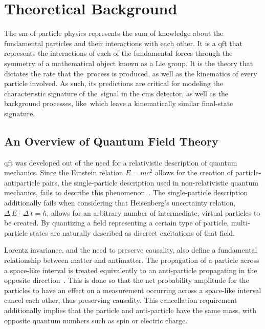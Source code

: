 \chapter{Theoretical Background}
\label{theoretical_background}

\par The \acrfull{sm} of particle physics represents the sum of
knowledge about the fundamental particles and their interactions with
each other.  It is a \acrfull{qft} that represents the interactions of each of the
fundamental forces through the symmetry of a mathematical object
known as a Lie group.  It is the theory that dictates the rate that
the~\ttH process is produced, as well as the kinematics of every
particle involved.  As such, its predictions are critical for modeling
the characteristic signature of the~\ttH signal in the \acrshort{cms}
detector, as well as the background processes, like~\ttbb which leave
a kinematically similar final-state signature.     


\section{An Overview of Quantum Field Theory}
\label{qft_overview}

\par \acrfull{qft} was developed out of the need for a
relativistic description of quantum mechanics.  Since the Einstein
relation $E=mc^{2}$ allows for the creation of particle-antiparticle
pairs, the single-particle description used in non-relativistic quantum
mechanics, fails to describe this phenomenon~\cite{Peskin_Schroeder}.
The single-particle description additionally fails when considering that Heisenberg's uncertainty
relation, $\Delta~E\cdot~\Delta~t = \hbar$, allows for an arbitrary
number of intermediate, virtual particles to be created.  By
quantizing a field representing a certain type of particle,
multi-particle states are naturally described as discreet excitations
of that field.  

\par Lorentz invariance, and the need to preserve causality, also define a
fundamental relationship between matter and antimatter.  The
propagation of a particle across a space-like interval is treated
equivalently to an anti-particle propagating in the opposite
direction~\cite{Peskin_Schroeder}.  This is done so that the net
probability amplitude for the particles to have an effect on a 
measurement occurring across a space-like interval cancel each other,
thus preserving causality.  This cancellation requirement additionally
implies that the particle and anti-particle have the same mass, with
opposite quantum numbers such as spin or electric charge.   

